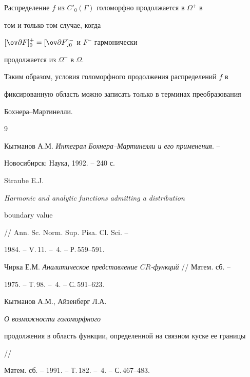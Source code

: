  


\begin{cor} 


Распределение $f$ из $C'_0(\Gamma)$ голоморфно продолжается в $\Omega^+$ в 


том и только том случае, когда 


$[\ov\partial F]^+_0=[\ov\partial F]^-_0$ и $F^-$ гармонически 


продолжается из $\Omega^-$ в $\Omega$. 


\end{cor} 


 


Таким образом, условия голоморфного продолжения распределений $f$ в 


фиксированную область можно записать только в терминах преобразования 


Бохнера--Мартинелли. 


 


 


\begin{thebibliography}{9} 


 




Кытманов А.М. {\em Интеграл Бохнера--Мартинелли и его применения}. -- 


Новосибирск: Наука, 1992. -- 240 с. 




Straube E.J. {\em Harmonic and analytic functions admitting a distribution 


boundary value} // Ann. Sc. Norm. Sup. Pisa. Cl. Sci. -- 


1984. -- V.\,11. -- \No\,4. -- Р.\,559--591. 




Чирка Е.М. {\em Аналитическое представление $CR$-функций} // Матем. сб. -- 


1975. -- Т.\,98. -- \No\,4. -- С.\,591--623. 




Кытманов А.М., Айзенберг Л.А. {\em О возможности голоморфного 


продолжения в область функции, определенной на связном куске ее границы} 


// 


Матем. сб. -- 1991. -- Т.\,182. -- \No\,4. -- С.\,467--483. 


 


\end{thebibliography} 


 


\vskip 2cm 


 






 


\label{end} 


 


